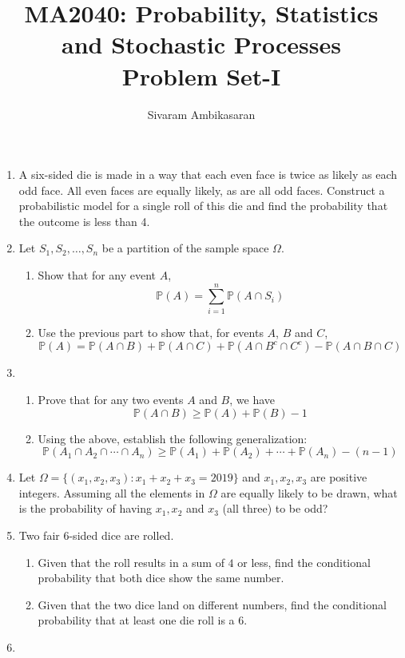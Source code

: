 \documentclass{article}
\title{MA2040: Probability, Statistics and Stochastic Processes\\
Problem Set-I}
\date{}
\author{Sivaram Ambikasaran}
\newcommand{\dsum}{\displaystyle\sum}
\newcommand{\dcap}{\displaystyle\cap}
\newcommand{\Pb}{\mathbb{P}}
\newcommand{\bkt}[1]{\left(#1\right)}
\begin{document}
	\maketitle
	\begin{enumerate}
		\item
		A six-sided die is made in a way that each even face is twice as likely as each odd face. All even faces are equally likely, as are all odd faces. Construct a probabilistic model for a single roll of this die and find the probability that the outcome is less than 4.
		\item
		Let $S_1,S_2,\ldots,S_n$ be a partition of the sample space $\Omega$.
		\begin{enumerate}
			\item
			Show that for any event $A$,
			$$\Pb(A) = \dsum_{i=1}^n \Pb\bkt{A \dcap S_i}$$
			\item
			Use the previous part to show that, for events $A$, $B$ and $C$,
			$$\Pb\bkt{A} = \Pb\bkt{A \dcap B} + \Pb\bkt{A \dcap C} + \Pb\bkt{A \dcap B^c \dcap C^c} - \Pb\bkt{A \dcap B \dcap C}$$
		\end{enumerate}
		\item
		\begin{enumerate}
			\item
			Prove that for any two events $A$ and $B$, we have
			$$\Pb\bkt{A \dcap B} \geq \Pb(A) + \Pb(B) - 1$$
			\item
			Using the above, establish the following generalization:
			$$\Pb\bkt{A_1 \dcap A_2 \dcap \cdots \dcap A_n} \geq \Pb\bkt{A_1} + \Pb\bkt{A_2} + \cdots + \Pb\bkt{A_n} - \bkt{n-1}$$
		\end{enumerate}
		\item
		Let $\Omega = \{\bkt{x_1,x_2,x_3}: x_1+x_2+x_3 = 2019\}$ and $x_1,x_2,x_3$ are positive integers. Assuming all the elements in $\Omega$ are equally likely to be drawn, what is the probability of having $x_1,x_2$ and $x_3$ (all three) to be odd?
		\item
		Two fair $6$-sided dice are rolled.
		\begin{enumerate}
			\item
			Given that the roll results in a sum of $4$ or less, find the conditional probability that both dice show the same number.
			\item
			Given that the two dice land on different numbers, find the conditional probability that at least one die roll is a $6$.
		\end{enumerate}
		\item

\end{enumerate}
\end{document}
